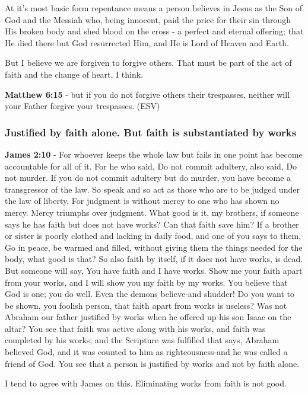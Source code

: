 \documentclass[11pt]{article}
\begin{document}
At it's most basic form repentance means a person believes in Jesus as the Son of God and the Messiah who, being innocent, paid the price for their sin through His broken body and shed blood on the cross - a perfect and eternal offering; that He died there but God resurrected Him, and He is Lord of Heaven and Earth.

But I believe we are forgiven to forgive others. That must be part of the act of faith and the change of heart, I think.

\textbf{Matthew 6:15} - but if you do not forgive others their trespasses, neither will your Father forgive your trespasses. (ESV)

\subsubsection{Justified by faith alone. But faith is substantiated by works}
\label{sec:org462f336}
\textbf{James 2:10} - For whoever keeps the whole law but fails in one point has become accountable for all of it. For he who said, Do not commit adultery, also said, Do not murder. If you do not commit adultery but do murder, you have become a transgressor of the law. So speak and so act as those who are to be judged under the law of liberty. For judgment is without mercy to one who has shown no mercy. Mercy triumphs over judgment. What good is it, my brothers, if someone says he has faith but does not have works? Can that faith save him? If a brother or sister is poorly clothed and lacking in daily food, and one of you says to them, Go in peace, be warmed and filled, without giving them the things needed for the body, what good is that? So also faith by itself, if it does not have works, is dead. But someone will say, You have faith and I have works. Show me your faith apart from your works, and I will show you my faith by my works. You believe that God is one; you do well. Even the demons believe-and shudder! Do you want to be shown, you foolish person, that faith apart from works is useless? Was not Abraham our father justified by works when he offered up his son Isaac on the altar? You see that faith was active along with his works, and faith was completed by his works; and the Scripture was fulfilled that says, Abraham believed God, and it was counted to him as righteousness-and he was called a friend of God. You see that a person is justified by works and not by faith alone.

I tend to agree with James on this.
Eliminating works from faith is not good.
\end{document}
